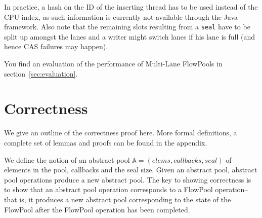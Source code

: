 \documentclass[runningheads,a4paper]{llncs}
\begin{document}
In practice, a hash on the ID of the inserting thread has to be used
instead of the CPU index, as such information is currently not
available through the Java framework. Also note that the remaining
slots resulting from a \verb=seal= have to be split up amongst the
lanes and a writer might switch lanes if his lane is full (and hence
CAS failures may happen).

You find an evaluation of the performance of Multi-Lane FlowPools in
section~\ref{sec:evaluation}.

\section{Correctness}
\label{sec:correctness}
We give an outline of the correctness proof here. More formal
definitions, a complete set of lemmas and proofs can be found in the
appendix.

We define the notion of an abstract pool $\mathbb{A} = (elems,
callbacks, seal)$ of elements in the pool, callbacks and the seal
size.
Given an abstract pool, abstract pool operations produce a new
abstract pool.
The key to showing correctness is to show that an abstract pool operation
corresponds to a FlowPool operation-- that is, it produces a
new abstract pool corresponding to the state of the FlowPool after
the FlowPool operation has been completed.



%
\end{document}
